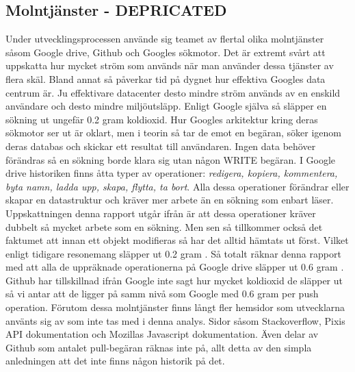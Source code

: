 \subsection{Molntjänster - DEPRICATED}
Under utvecklingsprocessen använde sig teamet av flertal olika molntjänster såsom Google drive, Github och Googles sökmotor. Det är extremt svårt att uppskatta hur mycket ström som används när man använder dessa tjänster av flera skäl. Bland annat så påverkar tid på dygnet hur effektiva Googles data centrum är\cite{google-warehouse}. Ju effektivare datacenter desto mindre ström används av en enskild användare och desto mindre miljöutsläpp. Enligt Google själva så släpper en sökning ut ungefär 0.2 gram koldioxid\cite{google-blog}. Hur Googles arkitektur kring deras sökmotor ser ut är oklart, men i teorin så tar de emot en begäran, söker igenom deras databas och skickar ett resultat till användaren. Ingen data behöver förändras så en sökning borde klara sig utan någon WRITE begäran. I Google drive historiken finns åtta typer av operationer: \textit{redigera, kopiera, kommentera, byta namn, ladda upp, skapa, flytta, ta bort}. Alla dessa operationer förändrar eller skapar en datastruktur och kräver mer arbete än en sökning som enbart läser. Uppskattningen denna rapport utgår ifrån är att dessa operationer kräver dubbelt så mycket arbete som en sökning. Men sen så tillkommer också det faktumet att innan ett objekt modifieras så har det alltid hämtats ut först. Vilket enligt tidigare resonemang släpper ut 0.2 gram . Så totalt räknar denna rapport med att alla de uppräknade operationerna på Google drive släpper ut 0.6 gram . Github har tillskillnad ifrån Google inte sagt hur mycket koldioxid de släpper ut så vi antar att de ligger på samm nivå som Google med 0.6 gram  per push operation. Förutom dessa molntjänster finns långt fler hemsidor som utvecklarna använts sig av som inte tas med i denna analys. Sidor såsom Stackoverflow, Pixis API dokumentation och Mozillas Javascript dokumentation. Även delar av Github som antalet pull-begäran räknas inte på, allt detta av den simpla anledningen att det inte finns någon historik på det.